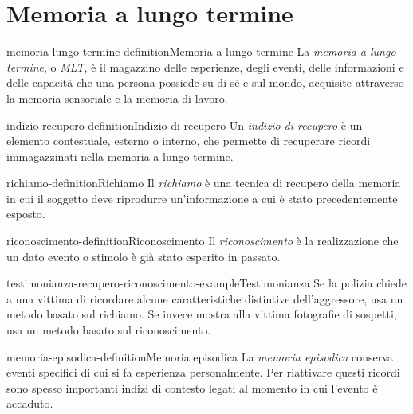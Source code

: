 \documentclass[preview]{standalone}
\begin{document}
\genpage

\section{Memoria a lungo termine}

\begin{snippetdefinition}{memoria-lungo-termine-definition}{Memoria a lungo termine}
    La \emph{memoria a lungo termine}, o \emph{MLT}, è il magazzino delle
    esperienze, degli eventi, delle informazioni e delle capacità che una
    persona possiede su di sé e sul mondo, acquisite attraverso la memoria
    sensoriale e la memoria di lavoro.
\end{snippetdefinition}


\begin{snippetdefinition}{indizio-recupero-definition}{Indizio di recupero}
    Un \emph{indizio di recupero} è un elemento contestuale, esterno o interno,
    che permette di recuperare ricordi immagazzinati nella memoria a lungo
    termine.
\end{snippetdefinition}

\begin{snippetdefinition}{richiamo-definition}{Richiamo}
    Il \emph{richiamo} è una tecnica di recupero della memoria in cui il
    soggetto deve riprodurre un'informazione a cui è stato precedentemente
    esposto.
\end{snippetdefinition}

\begin{snippetdefinition}{riconoscimento-definition}{Riconoscimento}
    Il \emph{riconoscimento} è la realizzazione che un dato evento o stimolo è
    già stato esperito in passato.
\end{snippetdefinition}

\begin{snippetexample}{testimonianza-recupero-riconoscimento-example}{Testimonianza}
    Se la polizia chiede a una vittima di ricordare alcune caratteristiche
    distintive dell'aggressore, usa un metodo basato sul richiamo. Se invece
    mostra alla vittima fotografie di sospetti, usa un metodo basato sul
    riconoscimento.
\end{snippetexample}

\begin{snippetdefinition}{memoria-episodica-definition}{Memoria episodica}
    La \emph{memoria episodica} conserva eventi specifici di cui si fa
    esperienza personalmente. Per riattivare questi ricordi sono spesso
    importanti indizi di contesto legati al momento in cui l'evento è accaduto.
\end{snippetdefinition}
\end{document}
